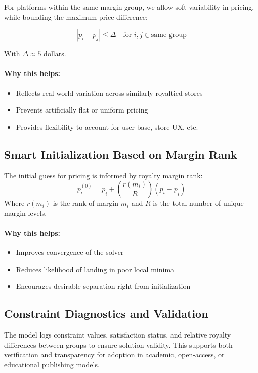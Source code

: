 For platforms within the same margin group, we allow soft variability in pricing, while bounding the maximum price difference:

\[
|p_i - p_j| \leq \Delta \quad \text{for } i, j \in \text{same group}
\]

With \( \Delta \approx 5 \) dollars.

\paragraph{Why this helps:}
\begin{itemize}
    \item Reflects real-world variation across similarly-royaltied stores
    \item Prevents artificially flat or uniform pricing
    \item Provides flexibility to account for user base, store UX, etc.
\end{itemize}

\subsection{Smart Initialization Based on Margin Rank}

The initial guess for pricing is informed by royalty margin rank:
\[
p_i^{(0)} = \underline{p}_i + \left( \frac{r(m_i)}{R} \right)(\overline{p}_i - \underline{p}_i)
\]
Where \( r(m_i) \) is the rank of margin \( m_i \) and \( R \) is the total number of unique margin levels.

\paragraph{Why this helps:}
\begin{itemize}
    \item Improves convergence of the solver
    \item Reduces likelihood of landing in poor local minima
    \item Encourages desirable separation right from initialization
\end{itemize}

\subsection{Constraint Diagnostics and Validation}

The model logs constraint values, satisfaction status, and relative royalty differences between groups to ensure solution validity. This supports both verification and transparency for adoption in academic, open-access, or educational publishing models.

